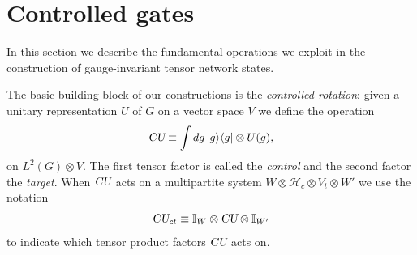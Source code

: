 \documentclass[12pt]{amsart}
\def\CU{\textsl{CU}}
\theoremstyle{definition}
\theoremstyle{remark}
\numberwithin{equation}{section}
\begin{document}
\section{Controlled gates}
In this section we describe the fundamental operations we exploit in the construction of gauge-invariant tensor network states. 

The basic building block of our constructions is the \emph{controlled rotation}: given a unitary representation $U$ of $G$ on a vector space $V$ we define the operation
\begin{equation}
	\CU \equiv \int dg\, |g\rangle\langle g| \otimes U(g),
\end{equation}
on $L^2(G)\otimes V$. The first tensor factor is called the \emph{control} and the second factor the \emph{target}. When $\CU$ acts on a multipartite system $W\otimes \mathcal{H}_c\otimes V_t\otimes W'$ we use the notation
\begin{equation}
	\CU_{ct} \equiv \mathbb{I}_W\otimes \CU\otimes \mathbb{I}_{W'}
\end{equation}
to indicate which tensor product factors $\CU$ acts on.
\end{document}
